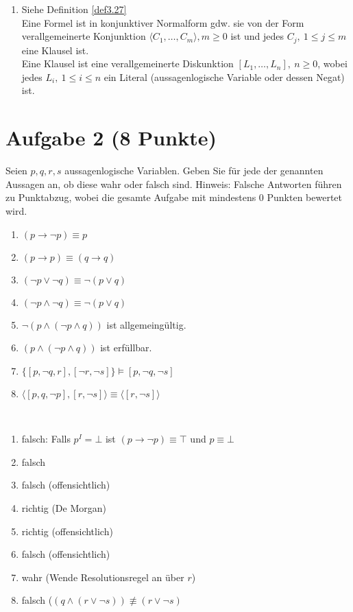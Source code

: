 \begin{lösung}
\begin{enumerate}
			Wenn $I$ Modell für $\G$ ist, dann ist $I$ auch Modell für $F$.
		\item Siehe Definition \ref{def3.27}\\
			Eine Formel ist in konjunktiver Normalform gdw. sie von der Form verallgemeinerte Konjunktion $\langle C_1,\ldots,C_m\rangle,m\geq0$ ist und jedes $C_j,~1\leq j\leq m$ eine Klausel ist.\\
			Eine Klausel ist eine verallgemeinerte Diskunktion  $[L_1,\ldots,L_n],~n\geq0$, wobei jedes $L_i,~1\leq i\leq n$ ein Literal (aussagenlogische Variable oder dessen Negat) ist.
	\end{enumerate}
\end{lösung}

\section*{Aufgabe 2 (8 Punkte)}
Seien $p,q,r,s$ aussagenlogische Variablen. Geben Sie für jede der genannten Aussagen an, ob diese wahr oder falsch sind.\nl
Hinweis: Falsche Antworten führen zu Punktabzug, wobei die gesamte Aufgabe mit mindestens 0 Punkten bewertet wird.

\begin{enumerate}[label=\alph*)]
	\item $(p\to\neg p)\equiv p$
	\item $(p\to p)\equiv(q\to q)$
	\item $(\neg p\vee\neg q)\equiv \neg(p\vee q)$
	\item $(\neg p\wedge\neg q)\equiv \neg(p\vee q)$
	\item $\neg(p\wedge(\neg p\wedge q))$ ist allgemeingültig.
	\item $(p\wedge(\neg p\wedge q))$ ist erfüllbar.
	\item $\big\lbrace[p,\neg q,r],[\neg r,\neg s]\big\rbrace\models[p,\neg q,\neg s]$
	\item $\big\langle[p,q,\neg p],[r,\neg s]\big\rangle\equiv\big\langle[r,\neg s]\big\rangle$
\end{enumerate}

\begin{lösung}\
	\begin{enumerate}[label=\alph*)]
		\item falsch: Falls $p^I=\bot$ ist $(p\to\neg p)\equiv\top$ und $p\equiv\bot$
		\item falsch
		\item falsch (offensichtlich)
		\item richtig (De Morgan)
		\item richtig (offensichtlich)
		\item falsch (offensichtlich)
		\item wahr (Wende Resolutionsregel an über $r$)
		\item falsch ($(q\wedge(r\vee\neg s))\not\equiv(r\vee\neg s)$
	\end{enumerate}
\end{lösung}

